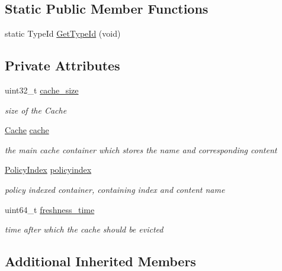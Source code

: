 \subsection*{Static Public Member Functions}
\begin{DoxyCompactItemize}
\item 
static Type\-Id \hyperlink{classns3_1_1SimpleUniversalCaching_a6141f83cd1ca033d3664758fe135a483}{Get\-Type\-Id} (void)
\end{DoxyCompactItemize}
\subsection*{Private Attributes}
\begin{DoxyCompactItemize}
\item 
uint32\-\_\-t \hyperlink{classns3_1_1SimpleUniversalCaching_a7bad9b82148c85412f776cd8581dda51}{cache\-\_\-size}
\begin{DoxyCompactList}\small\item\em size of the Cache \end{DoxyCompactList}\item 
\hyperlink{classns3_1_1NamedContentCache_a9aa35d883b9f4153d97b6e7dc74f9307}{Cache} \hyperlink{classns3_1_1SimpleUniversalCaching_aa6d19b19f2e287526b965cbb52c9f9e6}{cache}
\begin{DoxyCompactList}\small\item\em the main cache container which stores the name and corresponding content \end{DoxyCompactList}\item 
\hyperlink{classns3_1_1NamedContentCache_a0b728ea2d4e0acbe431897b2374cfc8e}{Policy\-Index} \hyperlink{classns3_1_1SimpleUniversalCaching_a500ad999484b695f8e7acaf07b6baf96}{policyindex}
\begin{DoxyCompactList}\small\item\em policy indexed container, containing index and content name \end{DoxyCompactList}\item 
uint64\-\_\-t \hyperlink{classns3_1_1SimpleUniversalCaching_ab7a35c71985c4567f09db5e21decc14b}{freshness\-\_\-time}
\begin{DoxyCompactList}\small\item\em time after which the cache should be evicted \end{DoxyCompactList}\end{DoxyCompactItemize}
\subsection*{Additional Inherited Members}


